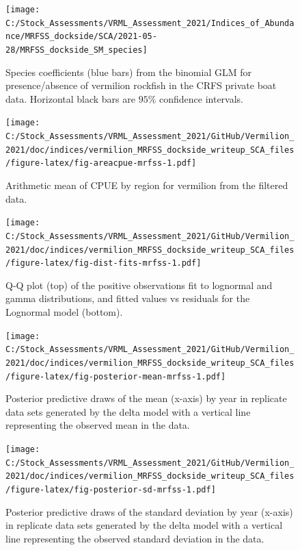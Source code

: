 \documentclass[11pt,
  english,
]{article}
\begin{document}
\FloatBarrier

\begin{figure}
\texttt{[image: C:/Stock\_Assessments/VRML\_Assessment\_2021/Indices\_of\_Abundance/MRFSS\_dockside/SCA/2021-05-28/MRFSS\_dockside\_SM\_species]} \caption{Species coefficients (blue bars) from the binomial GLM for presence/absence of vermilion rockfish in the CRFS private boat data. Horizontal black bars are $95\%$ confidence intervals.}\label{fig:fig-sm-mrfss}
\end{figure}

\FloatBarrier

\begin{figure}
\centering
\texttt{[image: C:/Stock\_Assessments/VRML\_Assessment\_2021/GitHub/Vermilion\_2021/doc/indices/vermilion\_MRFSS\_dockside\_writeup\_SCA\_files/figure-latex/fig-areacpue-mrfss-1.pdf]}
\caption{\label{fig:fig-areacpue-mrfss}Arithmetic mean of CPUE by region for vermilion from the filtered data.}
\end{figure}

\begin{figure}
\centering
\texttt{[image: C:/Stock\_Assessments/VRML\_Assessment\_2021/GitHub/Vermilion\_2021/doc/indices/vermilion\_MRFSS\_dockside\_writeup\_SCA\_files/figure-latex/fig-dist-fits-mrfss-1.pdf]}
\caption{\label{fig:fig-dist-fits-mrfss}Q-Q plot (top) of the positive observations fit to lognormal and gamma distributions, and fitted values vs residuals for the Lognormal model (bottom).}
\end{figure}

\begin{figure}
\centering
\texttt{[image: C:/Stock\_Assessments/VRML\_Assessment\_2021/GitHub/Vermilion\_2021/doc/indices/vermilion\_MRFSS\_dockside\_writeup\_SCA\_files/figure-latex/fig-posterior-mean-mrfss-1.pdf]}
\caption{\label{fig:fig-posterior-mean-mrfss}Posterior predictive draws of the mean (x-axis) by year in replicate data sets generated by the delta model with a vertical line representing the observed mean in the data.}
\end{figure}

\FloatBarrier

\begin{figure}
\centering
\texttt{[image: C:/Stock\_Assessments/VRML\_Assessment\_2021/GitHub/Vermilion\_2021/doc/indices/vermilion\_MRFSS\_dockside\_writeup\_SCA\_files/figure-latex/fig-posterior-sd-mrfss-1.pdf]}
\caption{\label{fig:fig-posterior-sd-mrfss}Posterior predictive draws of the standard deviation by year (x-axis) in replicate data sets generated by the delta model with a vertical line representing the observed standard deviation in the data.}
\end{figure}
\end{document}
